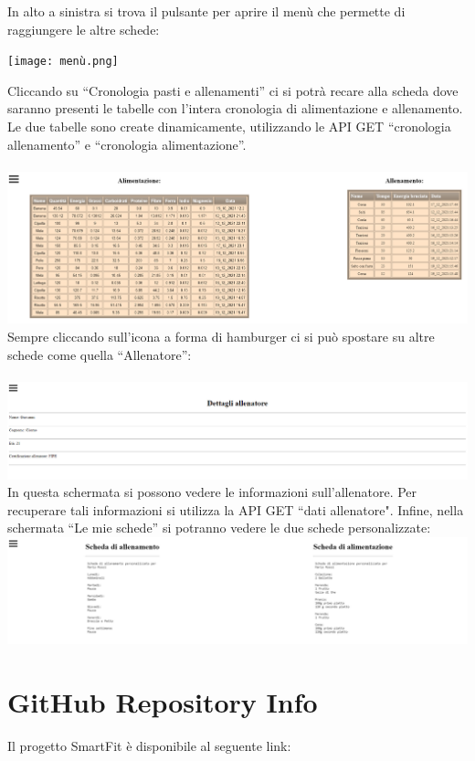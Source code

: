 \documentclass{article}
\begin{document}
   In alto a sinistra si trova il pulsante per aprire il menù che permette di raggiungere le altre schede:\\
   \begin{center}
      \texttt{[image: menù.png]}
   \end{center}
   Cliccando su “Cronologia pasti e allenamenti” ci si potrà recare alla scheda dove saranno presenti le tabelle con l’intera cronologia di alimentazione e allenamento. Le due tabelle sono create dinamicamente, utilizzando le API GET “cronologia allenamento” e “cronologia alimentazione”.\\
   \\
   \includegraphics[scale=0.4]{cronologia.png}\\
   Sempre cliccando sull’icona a forma di hamburger ci si può spostare su altre schede come quella “Allenatore”:\\
   \\
   \includegraphics[scale=0.4]{allenatore.png}
   In questa schermata si possono vedere le informazioni sull’allenatore. Per recuperare tali informazioni si utilizza la API GET “dati allenatore".
   Infine, nella schermata “Le mie schede” si potranno vedere le due schede personalizzate:\\
   \includegraphics[scale=0.4]{schede personalizzate.png}
   \section{GitHub Repository Info}
   Il progetto SmartFit è disponibile al seguente link:\\
\end{document}
